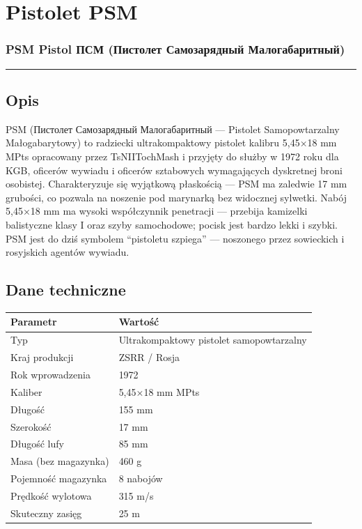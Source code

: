 \documentclass[12pt,openany,oneside]{book}
\begin{document}
\chapter{Pistolet PSM}\label{pistolet-psm}

\subsection{PSM Pistol \textbar{} ПСМ (Пистолет Самозарядный
Малогабаритный)}\label{psm-pistol-ux43fux441ux43c-ux43fux438ux441ux442ux43eux43bux435ux442-ux441ux430ux43cux43eux437ux430ux440ux44fux434ux43dux44bux439-ux43cux430ux43bux43eux433ux430ux431ux430ux440ux438ux442ux43dux44bux439}

\begin{center}\rule{0.5\linewidth}{0.5pt}\end{center}

\section{Opis}\label{opis-90}

PSM (Пистолет Самозарядный Малогабаритный --- Pistolet Samopowtarzalny
Małogabarytowy) to radziecki ultrakompaktowy pistolet kalibru 5,45×18 mm
MPts opracowany przez TsNIITochMash i przyjęty do służby w 1972 roku dla
KGB, oficerów wywiadu i oficerów sztabowych wymagających dyskretnej
broni osobistej. Charakteryzuje się wyjątkową płaskością --- PSM ma
zaledwie 17 mm grubości, co pozwala na noszenie pod marynarką bez
widocznej sylwetki. Nabój 5,45×18 mm ma wysoki współczynnik penetracji
--- przebija kamizelki balistyczne klasy I oraz szyby samochodowe;
pocisk jest bardzo lekki i szybki. PSM jest do dziś symbolem ``pistoletu
szpiega'' --- noszonego przez sowieckich i rosyjskich agentów wywiadu.

\section{Dane techniczne}\label{dane-techniczne-90}

\begin{longtable}[]{@{}ll@{}}
\toprule\noalign{}
Parametr & Wartość \\
\midrule\noalign{}
\endhead
\bottomrule\noalign{}
\endlastfoot
Typ & Ultrakompaktowy pistolet samopowtarzalny \\
Kraj produkcji & ZSRR / Rosja \\
Rok wprowadzenia & 1972 \\
Kaliber & 5,45×18 mm MPts \\
Długość & 155 mm \\
Szerokość & 17 mm \\
Długość lufy & 85 mm \\
Masa (bez magazynka) & 460 g \\
Pojemność magazynka & 8 nabojów \\
Prędkość wylotowa & 315 m/s \\
Skuteczny zasięg & 25 m \\
\end{longtable}
\end{document}
